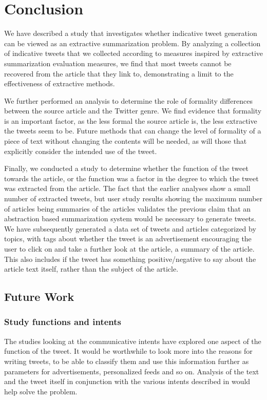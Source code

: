 \chapter{Conclusion}
We have described a study that investigates whether indicative tweet generation can be viewed as an extractive summarization problem. By analyzing a collection of indicative tweets that we collected according to measures inspired by extractive summarization evaluation measures, we find that most tweets cannot be recovered from the article that they link to, demonstrating a limit to the effectiveness of extractive methods.

We further performed an analysis to determine the role of formality differences between the source article and the Twitter genre. We find evidence that formality is an important factor, as the less formal the source article is, the less extractive the tweets seem to be. Future methods that can change the level of formality of a piece of text without changing the contents will be needed, as will those that explicitly consider the intended use of the tweet.

Finally, we conducted a study to determine whether the function of the tweet towards the article, or the function was a factor in the degree to which the tweet was extracted from the article. The fact that the earlier analyses show a small number of extracted tweets, but user study results showing the maximum number of articles being summaries of the articles validates the previous claim that an abstraction based summarization system would be necessary to generate tweets. We have subsequently generated a data set of tweets and articles categorized by topics, with tags about whether the tweet is an advertisement encouraging the user to click on and take a further look at the article, a summary of the article. This also includes if the tweet has something positive/negative to say about the article text itself, rather than the subject of the article. 


\section{Future Work}

\subsection{Study functions and intents}
The studies looking at the communicative intents have explored one aspect of the function of the tweet. It would be worthwhile to look more into the reasons for writing tweets, to be able to classify them and use this information further as parameters for advertisements, personalized feeds and so on. Analysis of the text and the tweet itself in conjunction with the various intents described in \cite{sinclair1996preliminary} would help solve the problem.

